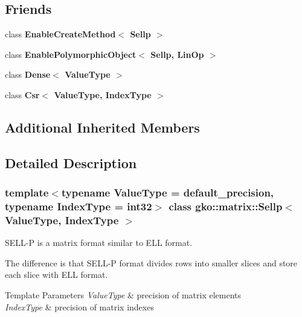 \subsection*{Friends}
\begin{DoxyCompactItemize}
\item 
\mbox{\label{classgko_1_1matrix_1_1Sellp_a6dcfab4b2f117cf840ccbd963f2f5083}} 
class {\bfseries Enable\+Create\+Method$<$ Sellp $>$}
\item 
\mbox{\label{classgko_1_1matrix_1_1Sellp_a9f42518ddcbd7efd8347113f4184667d}} 
class {\bfseries Enable\+Polymorphic\+Object$<$ Sellp, Lin\+Op $>$}
\item 
\mbox{\label{classgko_1_1matrix_1_1Sellp_a22a84c8f67f946aa60a2fa8bf5835a32}} 
class {\bfseries Dense$<$ Value\+Type $>$}
\item 
\mbox{\label{classgko_1_1matrix_1_1Sellp_a3962faf971a3df6ff4c9226c61fb24cc}} 
class {\bfseries Csr$<$ Value\+Type, Index\+Type $>$}
\end{DoxyCompactItemize}
\subsection*{Additional Inherited Members}


\subsection{Detailed Description}
\subsubsection*{template$<$typename Value\+Type = default\+\_\+precision, typename Index\+Type = int32$>$\newline
class gko\+::matrix\+::\+Sellp$<$ Value\+Type, Index\+Type $>$}

S\+E\+L\+L-\/P is a matrix format similar to E\+LL format. 

The difference is that S\+E\+L\+L-\/P format divides rows into smaller slices and store each slice with E\+LL format.


\begin{DoxyTemplParams}{Template Parameters}
{\em Value\+Type} & precision of matrix elements \\
\hline
{\em Index\+Type} & precision of matrix indexes \\
\hline
\end{DoxyTemplParams}


